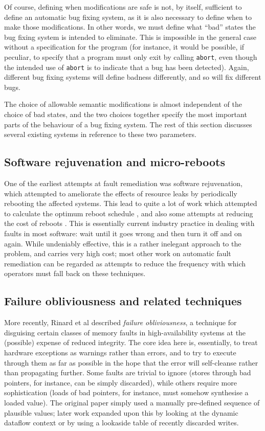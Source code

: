Of course, defining when modifications are safe is not, by itself,
sufficient to define an automatic bug fixing system, as it is also
necessary to define when to make those modifications.  In other words,
we must define what ``bad'' states the bug fixing system is intended
to eliminate.  This is impossible in the general case without a
specification for the program (for instance, it would be possible, if
peculiar, to specify that a program must only exit by calling
\texttt{abort}, even though the intended use of \texttt{abort} is to
indicate that a bug has been detected).  Again, different bug fixing
systems will define badness differently, and so will fix different
bugs.

The choice of allowable semantic modifications is almost independent
of the choice of bad states, and the two choices together specify the
most important parts of the behaviour of a bug fixing system.  The
rest of this section discusses several existing systems in reference
to these two parameters.

\subsection{Software rejuvenation and micro-reboots}

One of the earliest attempts at fault remediation was software
rejuvenation\cite{Huang1995}, which attempted to ameliorate the
effects of resource leaks by periodically rebooting the affected
systems.  This lead to quite a lot of work which attempted to
calculate the optimum reboot schedule
\cite{Garg1998,Li2002,Vaidyanathan2001}, and also some attempts at
reducing the cost of reboots \cite{Candea2002,Patterson2002}.  This is
essentially current industry practice in dealing with faults in most
software: wait until it goes wrong and then turn it off and on again.
While undeniably effective, this is a rather inelegant approach to the
problem, and carries very high cost; most other work on automatic
fault remediation can be regarded as attempts to reduce the frequency
with which operators must fall back on these techniques.

\subsection{Failure obliviousness and related techniques}
More recently, Rinard et al\cite{Rinard2004} described \emph{failure
  obliviousness}, a technique for disguising certain classes of memory
faults in high-availability systems at the (possible) expense of
reduced integrity.  The core idea here is, essentially, to treat
hardware exceptions as warnings rather than errors, and to try to
execute through them as far as possible in the hope that the error
will self-cleanse rather than propagating further.  Some faults are
trivial to ignore (stores through bad pointers, for instance, can be
simply discarded), while others require more sophistication (loads of
bad pointers, for instance, must somehow synthesise a loaded value).
The original paper simply used a manually pre-defined sequence of
plausible values; later work expanded upon this by looking at the
dynamic dataflow context\cite{Nagarajan2009} or by using a lookaside
table of recently discarded writes\cite{Rinard2005a}.

